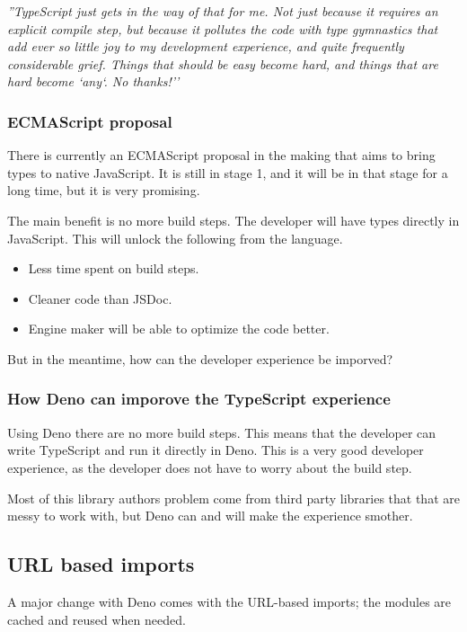 \documentclass[10pt,journal,compsoc]{IEEEtran}
\begin{document}
\textit{''TypeScript just gets in the way of that for me. Not just because it requires an explicit compile step, but because it pollutes the code with type gymnastics that add ever so little joy to my development experience, and quite frequently considerable grief. Things that should be easy become hard, and things that are hard become `any`. No thanks!''}

\subsubsection{ECMAScript proposal}

There is currently an ECMAScript proposal in the making that aims to bring types to native JavaScript. It is still in stage 1, and it will be in that stage for a long time, but it is very promising.

The main benefit is no more build steps. The developer will have types directly in JavaScript. This will unlock the following from the language.

\begin{itemize}
    \item Less time spent on build steps.
    \item Cleaner code than JSDoc.
    \item Engine maker will be able to optimize the code better.
\end{itemize}

But in the meantime, how can the developer experience be imporved?

\subsubsection{How Deno can imporove the TypeScript experience}

Using Deno there are no more build steps. This means that the developer can write TypeScript and run it directly in Deno. This is a very good developer experience, as the developer does not have to worry about the build step.

Most of this library authors problem come from third party libraries that that are messy to work with, but Deno can and will make the experience smother.

\subsection{URL based imports}

A major change with Deno comes with the URL-based imports; the modules are cached and reused when needed.
\end{document}

